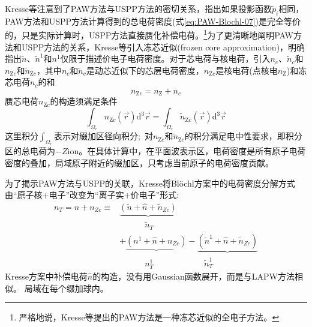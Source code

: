 \textrm{Kresse}等注意到了\textrm{PAW}方法与\textrm{USPP}方法的密切关系，指出如果投影函数$\tilde p_i$相同，\textrm{PAW}方法和\textrm{USPP}方法计算得到的总电荷密度(式\eqref{eq:PAW-Blochl-07})是完全等价的，只是实际计算时，\textrm{USPP}方法直接赝化补偿电荷。\footnote{严格地说，\textrm{Kresse}等提出的\textrm{PAW}方法是一种冻芯近似的全电子方法。}为了更清晰地阐明\textrm{PAW}方法和\textrm{USPP}方法的关系，\textrm{Kresse}等引入冻芯近似(\textrm{frozen core approximation})，明确指出$\tilde n$、$\tilde n^1$和$n^1$仅限于描述价电子电荷密度。对于芯电荷与核电荷，引入$n_c$、$\tilde n_c$和$n_{\mathrm{Z}c}$和$\tilde n_{\mathrm{Z}c}$，其中$n_c$和$\tilde n_c$是动芯近似下的芯层电荷密度，$n_{\mathrm{Z}c}$是核电荷(点核电$n_{\mathrm Z}$)和冻芯电荷$n_c$的和
\begin{displaymath}
	n_{\mathrm{Z}c}=n_{\mathrm{Z}}+n_c
\end{displaymath}
赝芯电荷$n_{\mathrm{Z}c}$的构造须满足条件
\begin{equation}
	\int_{\Omega_r}n_{\mathrm{Z}c}(\vec r)\mathrm{d}^3\vec r=\int_{\Omega_r}\tilde n_{\mathrm{Z}c}(\vec r)\mathrm{d}^3\vec r
	\label{eq:PAW_Kresse_01}
\end{equation}
这里积分$\int_{\Omega_r}$表示对缀加区径向积分;~对$n_{\mathrm{Z}c}$和$\tilde n_{\mathrm{Z}c}$的积分满足电中性要求，即积分区的总电荷为$-Z{\mathrm{ion}}$。在具体计算中，在平面波表示区，电荷密度是所有原子电荷密度的叠加，局域原子附近的缀加区，只考虑当前原子的电荷密度贡献。

为了揭示\textrm{PAW}方法与\textrm{USPP}的关联，\textrm{Kresse}将\textrm{Bl\"ochl}方案中的电荷密度分解方式由“原子核+电子”改变为“离子实+价电子”形式:~
\begin{equation}
	\begin{aligned}
		n_T=n+n_{Zc}\equiv&\underbrace{(\tilde n+\hat n+\tilde n_{Zc})}\\
				 		&\quad\qquad\tilde n_T\\
				  &+\underbrace{(n^1+\hat n+n_{Zc})}-\underbrace{(\tilde n^1+\hat n+\tilde n_{Zc})}\\
				                  &\quad\qquad n_T^1\qquad\qquad\qquad\tilde n_T^1
	\end{aligned}
	\label{eq:PAW_Kresse_02}
\end{equation}
\textrm{Kresse}方案中补偿电荷$\hat n$的构造，没有用\textrm{Gaussian}函数展开，而是与\textrm{LAPW}方法相似。
局域在每个缀加球内。

